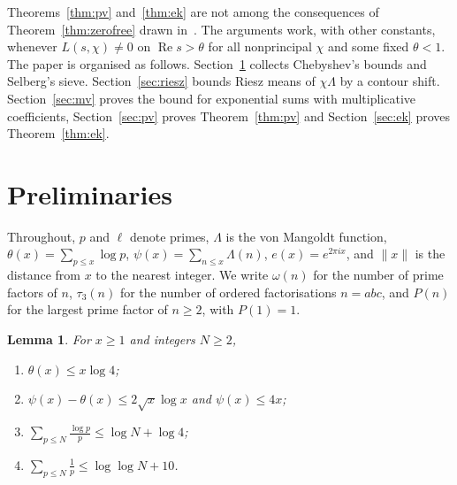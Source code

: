 \documentclass{aomart}
\numberwithin{equation}{section}
\newtheorem{lemma}[theorem]{Lemma}
\theoremstyle{definition}
\renewcommand{\Re}{\operatorname{Re}}
\begin{document}
Theorems~\ref{thm:pv} and~\ref{thm:ek} are not among the consequences of
Theorem~\ref{thm:zerofree} drawn in~\cite{OAI26}. The arguments work, with other constants, whenever $L(s,\chi)\ne0$ on $\Re s>\theta$ for all nonprincipal $\chi$
and some fixed $\theta<1$.
The paper is organised as follows. Section~\ref{sec:prelim} collects Chebyshev's bounds and
Selberg's sieve. Section~\ref{sec:riesz} bounds Riesz means of $\chi\Lambda$ by a contour shift.
Section~\ref{sec:mv} proves the bound for exponential sums with multiplicative coefficients,
Section~\ref{sec:pv} proves Theorem~\ref{thm:pv} and Section~\ref{sec:ek} proves
Theorem~\ref{thm:ek}.

\section{Preliminaries}\label{sec:prelim}

Throughout, $p$ and $\ell$ denote primes, $\Lambda$ is the von Mangoldt function,
$\theta(x)=\sum_{p\le x}\log p$, $\psi(x)=\sum_{n\le x}\Lambda(n)$, $e(x)=e^{2\pi ix}$, and
$\|x\|$ is the distance from $x$ to the nearest integer. We write $\omega(n)$ for the number of
prime factors of $n$, $\tau_3(n)$ for the number of ordered factorisations $n=abc$, and $P(n)$
for the largest prime factor of $n\ge2$, with $P(1)=1$.

\begin{lemma}\label{lem:chebyshev}
For $x\ge1$ and integers $N\ge2$,
\begin{enumerate}
\item[(i)] $\theta(x)\le x\log4$;
\item[(ii)] $\psi(x)-\theta(x)\le2\sqrt x\log x$ and $\psi(x)\le4x$;
\item[(iii)] $\sum_{p\le N}\frac{\log p}p\le\log N+\log4$;
\item[(iv)] $\sum_{p\le N}\frac1p\le\log\log N+10$.
\end{enumerate}
\end{lemma}
\end{document}
